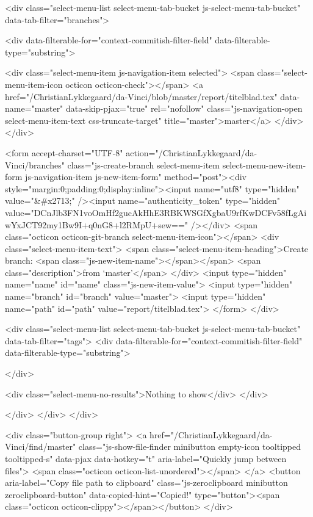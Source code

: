       <div class="select-menu-list select-menu-tab-bucket js-select-menu-tab-bucket" data-tab-filter="branches">

        <div data-filterable-for="context-commitish-filter-field" data-filterable-type="substring">


            <div class="select-menu-item js-navigation-item selected">
              <span class="select-menu-item-icon octicon octicon-check"></span>
              <a href="/ChristianLykkegaard/da-Vinci/blob/master/report/titelblad.tex"
                 data-name="master"
                 data-skip-pjax="true"
                 rel="nofollow"
                 class="js-navigation-open select-menu-item-text css-truncate-target"
                 title="master">master</a>
            </div>
        </div>

          <form accept-charset="UTF-8" action="/ChristianLykkegaard/da-Vinci/branches" class="js-create-branch select-menu-item select-menu-new-item-form js-navigation-item js-new-item-form" method="post"><div style="margin:0;padding:0;display:inline"><input name="utf8" type="hidden" value="&#x2713;" /><input name="authenticity_token" type="hidden" value="DCnJlb3FN1voOmHf2gucAkHhE3RBKWSGfXgbaU9rfKwDCFv58fLgAiwYxJCT92my1Bw9I+q0nG8+l2RMpU+sew==" /></div>
            <span class="octicon octicon-git-branch select-menu-item-icon"></span>
            <div class="select-menu-item-text">
              <span class="select-menu-item-heading">Create branch: <span class="js-new-item-name"></span></span>
              <span class="description">from ‘master’</span>
            </div>
            <input type="hidden" name="name" id="name" class="js-new-item-value">
            <input type="hidden" name="branch" id="branch" value="master">
            <input type="hidden" name="path" id="path" value="report/titelblad.tex">
</form>
      </div>

      <div class="select-menu-list select-menu-tab-bucket js-select-menu-tab-bucket" data-tab-filter="tags">
        <div data-filterable-for="context-commitish-filter-field" data-filterable-type="substring">


        </div>

        <div class="select-menu-no-results">Nothing to show</div>
      </div>

    </div>
  </div>
</div>

  <div class="button-group right">
    <a href="/ChristianLykkegaard/da-Vinci/find/master"
          class="js-show-file-finder minibutton empty-icon tooltipped tooltipped-s"
          data-pjax
          data-hotkey="t"
          aria-label="Quickly jump between files">
      <span class="octicon octicon-list-unordered"></span>
    </a>
    <button aria-label="Copy file path to clipboard" class="js-zeroclipboard minibutton zeroclipboard-button" data-copied-hint="Copied!" type="button"><span class="octicon octicon-clippy"></span></button>
  </div>

